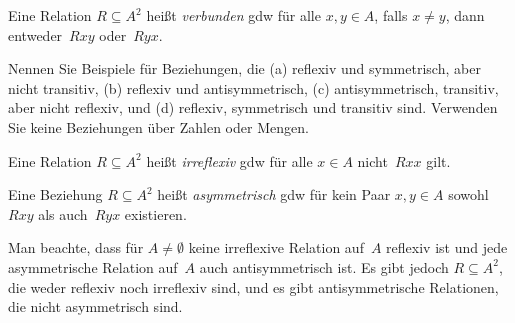\documentclass[../../../include/open-logic-section]{subfiles}
\begin{document}
\begin{defn}[Konnektivität]
Eine Relation $R \subseteq A^2$ heißt \emph{verbunden} gdw für alle $x,y\in
A$, falls $x \neq y$, dann entweder~$Rxy$ oder~$Ryx$.
\end{defn}

\begin{prob}
Nennen Sie Beispiele für Beziehungen, die (a) reflexiv und symmetrisch, aber
nicht transitiv, (b) reflexiv und antisymmetrisch, (c) antisymmetrisch,
transitiv, aber nicht reflexiv, und (d) reflexiv, symmetrisch und
transitiv sind.  Verwenden Sie keine Beziehungen über Zahlen oder Mengen.
\end{prob} 
 
\begin{defn}[Irreflexivität]
Eine Relation $R \subseteq A^2$ heißt \emph{irreflexiv} gdw für alle $x \in
A$ nicht~$Rxx$ gilt. 
\end{defn}

\begin{defn}[Asymmetrie]
Eine Beziehung $R \subseteq A^2$ heißt \emph{asymmetrisch} gdw für kein Paar $x,y\in
A$ sowohl $Rxy$ als auch~$Ryx$ existieren. 
\end{defn}

Man beachte, dass für $A \neq \emptyset$ keine irreflexive Relation auf~$A$
reflexiv ist und jede asymmetrische Relation auf~$A$ auch
antisymmetrisch ist. Es gibt jedoch $R \subseteq A^2$, die weder
reflexiv noch irreflexiv sind, und es gibt antisymmetrische
Relationen, die nicht asymmetrisch sind. 
\end{document}

